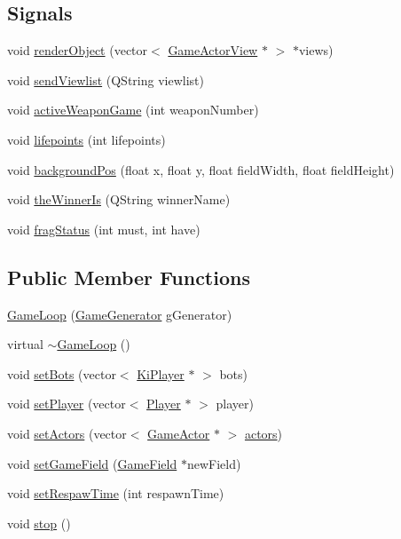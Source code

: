 \subsection*{Signals}
\begin{DoxyCompactItemize}
\item 
void \hyperlink{class_game_loop_ad5697eb532af7a8285f2a5b2173a1fb2}{render\+Object} (vector$<$ \hyperlink{class_game_actor_view}{Game\+Actor\+View} $\ast$ $>$ $\ast$views)
\item 
void \hyperlink{class_game_loop_a31966af3329677b02e4b9ac766835251}{send\+Viewlist} (Q\+String viewlist)
\item 
void \hyperlink{class_game_loop_a6e937ff7eddd17ee16157d757ec8d869}{active\+Weapon\+Game} (int weapon\+Number)
\item 
void \hyperlink{class_game_loop_a7b8774e746e18475abfd162b8c1ff1a8}{lifepoints} (int lifepoints)
\item 
void \hyperlink{class_game_loop_aadf44e47c371f83b0edda98ed5a4c96b}{background\+Pos} (float x, float y, float field\+Width, float field\+Height)
\item 
void \hyperlink{class_game_loop_a93c1aa53a02624ddd0078a67fe367fc7}{the\+Winner\+Is} (Q\+String winner\+Name)
\item 
void \hyperlink{class_game_loop_a357cac9658c9f6206d26c538fd7773ad}{frag\+Status} (int must, int have)
\end{DoxyCompactItemize}
\subsection*{Public Member Functions}
\begin{DoxyCompactItemize}
\item 
\hyperlink{class_game_loop_ae06492a249f44724b6781e414b282fbb}{Game\+Loop} (\hyperlink{class_game_generator}{Game\+Generator} g\+Generator)
\item 
virtual \hyperlink{class_game_loop_ae6c558d0d751a068dbafe2cae465ec1f}{$\sim$\+Game\+Loop} ()
\item 
void \hyperlink{class_game_loop_a7098cfdd1fe833df0f51d6f536c25a7a}{set\+Bots} (vector$<$ \hyperlink{class_ki_player}{Ki\+Player} $\ast$ $>$ bots)
\item 
void \hyperlink{class_game_loop_aa9cac681fffdcfde5df8b259409dd0ab}{set\+Player} (vector$<$ \hyperlink{class_player}{Player} $\ast$ $>$ player)
\item 
void \hyperlink{class_game_loop_a754c44ba0f01e81d411235d09e3296f5}{set\+Actors} (vector$<$ \hyperlink{class_game_actor}{Game\+Actor} $\ast$ $>$ \hyperlink{class_game_loop_a22d3c6823c5f67eccd389db6f5c2eb10}{actors})
\item 
void \hyperlink{class_game_loop_afa580dfac60d3a821ff1320c0da1cd56}{set\+Game\+Field} (\hyperlink{class_game_field}{Game\+Field} $\ast$new\+Field)
\item 
void \hyperlink{class_game_loop_ae32109f8170985968acce0525f71f015}{set\+Respaw\+Time} (int respawn\+Time)
\item 
void \hyperlink{class_game_loop_aee78756218e0fcf3ab73f4810c13dd0d}{stop} ()
\end{DoxyCompactItemize}
